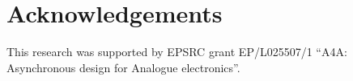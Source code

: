 \documentclass[conference]{IEEEtran}
\begin{document}

\section*{Acknowledgements}
\vspace{-0.5mm}

This research was supported by EPSRC grant EP/L025507/1 ``A4A: Asynchronous design
for Analogue electronics''.



\end{document}
